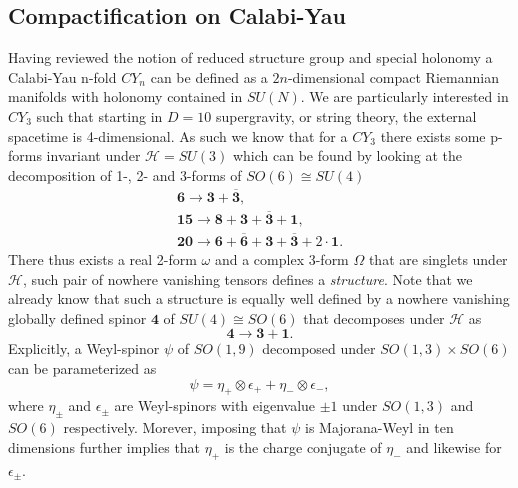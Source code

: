 \subsection{Compactification on Calabi-Yau}
Having reviewed the notion of reduced structure group and special holonomy a Calabi-Yau n-fold $CY_{n}$ can be defined as a $2n$-dimensional compact Riemannian manifolds with holonomy contained in $SU(N)$\cite{Blumenhagen2013}. We are particularly interested in $CY_3$ such that starting in $D=10$ supergravity, or string theory, the external spacetime is 4-dimensional. As such we know that for a $CY_3$ there exists some p-forms invariant under $\mathscr{H}=SU(3)$ which can be found by looking at the decomposition of 1-, 2- and 3-forms of $SO(6)\cong SU(4)$
\begin{align*}
    \mathbf{6}\to \mathbf{3}+\mathbf{\overbar{3}},\\
    \mathbf{15}\to \mathbf{8}+\mathbf{3}+\overbar{\mathbf{3}}+\mathbf{1},\\
    \mathbf{20}\to \mathbf{6}+\overbar{\mathbf{6}}+\mathbf{3}+\overbar{\mathbf{3}}+2\cdot\mathbf{1}.
\end{align*}
There thus exists a real 2-form $\omega$ and a complex 3-form $\Omega$ that are singlets under $\mathscr{H}$, such pair of nowhere vanishing tensors defines a \emph{structure}. Note that we already know that such a structure is equally well defined by a nowhere vanishing globally defined spinor $\mathbf{4}$ of $SU(4)\cong SO(6)$ that decomposes under $\mathscr{H}$ as 
\begin{equation}
    \mathbf{4}\to \mathbf{3}+\mathbf{1}.
\end{equation}
Explicitly, a Weyl-spinor $\psi$ of $SO(1,9)$ decomposed under $SO(1,3)\times SO(6)$ can be parameterized as 
\begin{equation}
    \psi = \eta_+\otimes\epsilon_++\eta_-\otimes\epsilon_-,
\end{equation}
where $\eta_\pm$ and $\epsilon_\pm$ are Weyl-spinors with eigenvalue $\pm 1$ under $SO(1,3)$ and $SO(6)$ respectively. Morever, imposing that $\psi$ is Majorana-Weyl in ten dimensions further implies that $\eta_+$ is the charge conjugate of $\eta_-$ and likewise for $\epsilon_\pm$.

